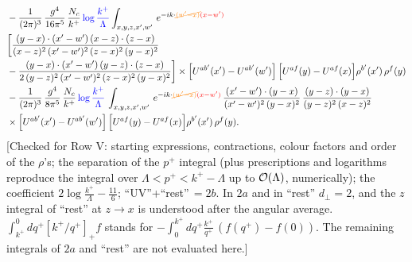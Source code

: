 \documentclass[9pt]{article}
\numberwithin{equation}{section}
\begin{document}
\begin{align}
&-\frac{1}{(2\pi)^{3}}\,\frac{g^{4}}{16\pi^{5}}\,\frac{N_{c}}{k^{+}}\,{\color{blue}\log\frac{k^{+}}{\Lambda}}\int_{x,y,z,x',w'}\,e^{-ik\cdot{\color{orange}\cancel{(w'-x)}}{\color{red}(x-w')}}\,\notag \\ & \bigg[\frac{(y-x)\cdot (x'-w')\,(x-z)\cdot (z-x)}{(x-z)^{2}\,(x'-w')^{2}\,(z-x)^{2}\,(y-x)^{2}}\notag \\ & -\frac{(y-x)\cdot (x'-w')\,(y-z)\cdot (z-x)}{2\,(y-z)^{2}\,(x'-w')^{2}\,(z-x)^{2}\,(y-x)^{2}}\bigg]\times\Big[U^{ab'}(x')-U^{ab'}(w')\Big]\,\Big[U^{af}(y)-U^{af}(x)\Big]\rho^{b'}(x')\,\rho^{f}(y)\notag\\
&-\frac{1}{(2\pi)^{3}}\,\frac{g^{4}}{8\pi^{5}}\,\frac{N_{c}}{k^{+}}\,{\color{blue}\log\frac{k^{+}}{\Lambda}}\,\int_{x,y,z,x',w'}\,e^{-ik\cdot{\color{orange}\cancel{(w'-x)}}{\color{red}(x-w')}}\,\frac{(x'-w')\cdot(y-x)}{(x'-w')^{2}\,(y-x)^{2}}\,\frac{(y-z)\cdot(y-x)}{(y-z)^{2}\,(x-z)^{2}}\notag\\
&\times\Big[U^{ab'}(x')-U^{ab'}(w')\Big]\,\Big[U^{af}(y)-U^{af}(x)\Big]\rho^{b'}(x')\,\rho^{f}(y).
\end{align} {\color{red}[Checked for Row V: starting expressions, contractions, colour factors and order of the $\rho$'s; the separation of the $p^{+}$ integral (plus prescriptions and logarithms reproduce the integral over $\Lambda<p^{+}<k^{+}-\Lambda$ up to ${\cal O}(\Lambda)$, numerically); the coefficient $2\log\frac{k^{+}}{\Lambda}-\frac{11}{6}$; ``UV''+``rest''$\,=2b$. In $2a$ and in ``rest'' $d_{\perp}=2$, and the $z$ integral of ``rest'' at $z\to x$ is understood after the angular average. $\int^{0}_{k^{+}}dq^{+}[k^{+}/q^{+}]_{+}f$ stands for $-\int_{0}^{k^{+}}dq^{+}\frac{k^{+}}{q^{+}}\,(f(q^{+})-f(0))$. The remaining integrals of $2a$ and ``rest'' are not evaluated here.]}\par\noindent 
\end{document}
